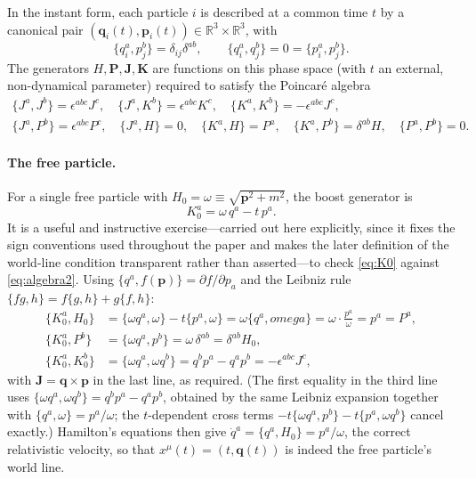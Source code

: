 In the instant form, each particle $i$ is described at a common time $t$ by a
canonical pair $({\bm q}_i(t),{\bm p}_i(t))\in\mathbb{R}^3\times\mathbb{R}^3$, with
\begin{equation}
\{q_i^a,p_j^b\}=\delta_{ij}\delta^{ab}, \qquad \{q_i^a,q_j^b\}=0=\{p_i^a,p_j^b\}.
\end{equation}
The generators $H,{\bm P},{\bm J},{\bm K}$ are functions on this phase space (with $t$ an
external, non-dynamical parameter) required to satisfy the Poincar\'e algebra
\begin{gather}
\{J^a,J^b\}=\epsilon^{abc}J^c, \quad \{J^a,K^b\}=\epsilon^{abc}K^c, 
    \quad \{K^a,K^b\}=-\epsilon^{abc}J^c, \label{eq:algebra1}\\
\{J^a,P^b\}=\epsilon^{abc}P^c, \quad \{J^a,H\}=0, \quad \{K^a,H\}=P^a,
    \quad \{K^a,P^b\}=\delta^{ab}H, \quad \{P^a,P^b\}=0. \label{eq:algebra2}
\end{gather}

\paragraph{The free particle.} For a single free particle with
$H_0=\omega\equiv\sqrt{{\bm p}^2+m^2}$, the boost generator is
\begin{equation}
K_0^a = \omega\, q^a - t\,p^a .
\label{eq:K0}
\end{equation}
It is a useful and instructive exercise---carried out here explicitly, since it
fixes the sign conventions used throughout the paper and makes the later
definition of the world-line condition transparent rather than asserted---to
check \eqref{eq:K0} against \eqref{eq:algebra2}. Using
$\{q^a,f({\bm p})\}=\partial f/\partial p_a$ and the Leibniz rule
$\{fg,h\}=f\{g,h\}+g\{f,h\}$:
\begin{align}
\{K_0^a,H_0\} &= \{\omega q^a,\omega\} - t\{p^a,\omega\} = \omega\{q^a,omega\}
    = \omega\cdot\frac{p^a}{\omega} = p^a = P^a, \\
\{K_0^a,P^b\} &= \{\omega q^a,p^b\} = \omega\,\delta^{ab} = \delta^{ab}H_0, \\
\{K_0^a,K_0^b\} &= \{\omega q^a,\omega q^b\} = q^bp^a - q^ap^b = -\epsilon^{abc}J^c,
\end{align}
with ${\bm J}={\bm q}\times{\bm p}$ in the last line, as required. (The first equality in
the third line uses $\{\omega q^a,\omega q^b\}=q^bp^a-q^ap^b$, obtained by
the same Leibniz expansion together with $\{q^a,\omega\}=p^a/\omega$; the
$t$-dependent cross terms $-t\{\omega q^a,p^b\}-t\{p^a,\omega q^b\}$ cancel
exactly.) Hamilton's equations then give $\dot q^a=\{q^a,H_0\}=p^a/\omega$,
the correct relativistic velocity, so that $x^\mu(t)=(t,{\bm q}(t))$ is indeed the
free particle's world line.

